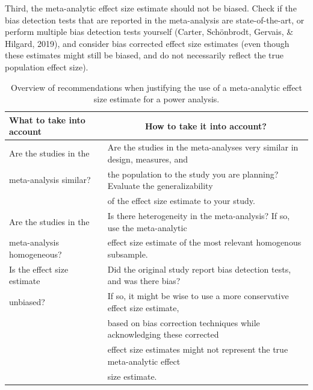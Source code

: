 \documentclass[
  english,
  ,jou,floatsintext]{apa6}
\begin{document}
Third, the meta-analytic effect size estimate should not be biased. Check if the bias detection tests that are reported in the meta-analysis are state-of-the-art, or perform multiple bias detection tests yourself (Carter, Schönbrodt, Gervais, \& Hilgard, 2019), and consider bias corrected effect size estimates (even though these estimates might still be biased, and do not necessarily reflect the true population effect size).

\begin{table}[tbp]

\begin{center}
\begin{threeparttable}

\caption{\label{tab:tablemetajust}Overview of recommendations when justifying the use of a meta-analytic effect size estimate for a power analysis.}

\begin{tabular}{ll}
\toprule
What to take into account & \multicolumn{1}{c}{How to take it into account?}\\
\midrule
Are the studies in the & Are the studies in the meta-analyses very similar in design, measures, and\\
meta-analysis similar? & the population to the study you are planning? Evaluate the generalizability\\
 & of the effect size estimate to your study.\\ \midrule
Are the studies in the & Is there heterogeneity in the meta-analysis? If so, use the meta-analytic\\
meta-analysis homogeneous? & effect size estimate of the most relevant homogenous subsample.\\ \midrule
Is the effect size estimate & Did the original study report bias detection tests, and was there bias?\\
unbiased? & If so, it might be wise to use a more conservative effect size estimate,\\
 & based on bias correction techniques while acknowledging these corrected\\
 & effect size estimates might not represent the true meta-analytic effect\\
 & size estimate.\\
\bottomrule
\end{tabular}

\end{threeparttable}
\end{center}

\end{table}
\end{document}
